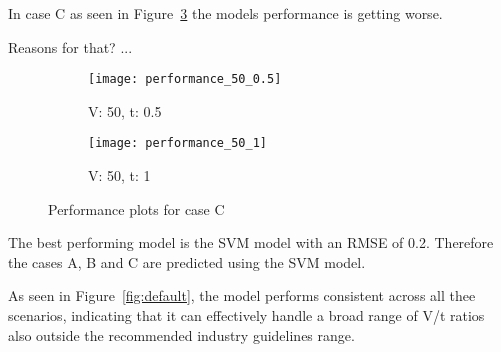 In case C as seen in Figure~\ref{fig:performance-case-c} the models performance is
getting worse.

Reasons for that? ...

\begin{figure}[H]
    \begin{tcolorbox}[arc=0pt,boxrule=0.5pt]
        \begin{subfigure}{0.5\textwidth}
            \texttt{[image: performance\_50\_0.5]}
            \caption{V: 50, t: 0.5}
            \label{fig:performance-30_1.5}
        \end{subfigure}
        \hfill
        \begin{subfigure}{0.5\textwidth}
            \texttt{[image: performance\_50\_1]}
            \caption{V: 50, t: 1}
            \label{fig:performance-30_2.0}
        \end{subfigure}
    \end{tcolorbox}
    \caption{Performance plots for case C}
    \label{fig:performance-case-c}
\end{figure}


The best performing model is the \ac{SVM} model with an \ac{RMSE} of 0.2.
Therefore the cases A, B and C are predicted using the \ac{SVM} model.

As seen in Figure~\ref{fig:default}, the model performs consistent across all thee
scenarios, indicating that it can effectively handle a broad range of V/t ratios also
outside the recommended industry guidelines range.



